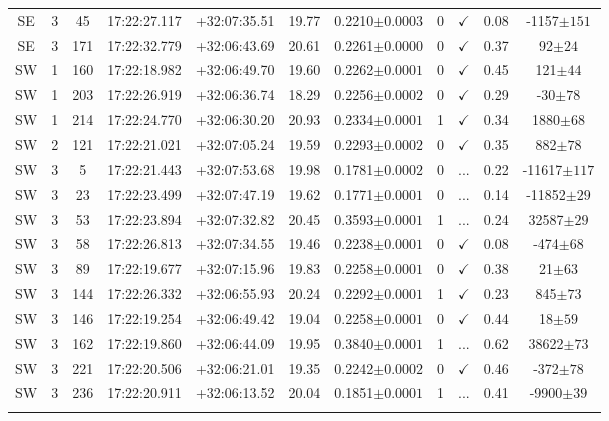 \begin{landscape}
\begin{longtable}{ccccccccccc}
	SE & 3 & 45 & 17:22:27.117 & +32:07:35.51 & 19.77 & 0.2210$\pm{0.0003}$ & 0 & $\checkmark$ & 0.08 & -1157$\pm{151}$ \\
	SE & 3 & 171 & 17:22:32.779 & +32:06:43.69 & 20.61 & 0.2261$\pm{0.0000}$ & 0 & $\checkmark$ & 0.37 & 92$\pm{24}$ \\
	SW & 1 & 160 & 17:22:18.982 & +32:06:49.70 & 19.60 & 0.2262$\pm{0.0001}$ & 0 & $\checkmark$ & 0.45 & 121$\pm{44}$ \\
	SW & 1 & 203 & 17:22:26.919 & +32:06:36.74 & 18.29 & 0.2256$\pm{0.0002}$ & 0 & $\checkmark$ & 0.29 & -30$\pm{78}$ \\
	SW & 1 & 214 & 17:22:24.770 & +32:06:30.20 & 20.93 & 0.2334$\pm{0.0001}$ & 1 & $\checkmark$ & 0.34 & 1880$\pm{68}$ \\
	SW & 2 & 121 & 17:22:21.021 & +32:07:05.24 & 19.59 & 0.2293$\pm{0.0002}$ & 0 & $\checkmark$ & 0.35 & 882$\pm{78}$ \\
	SW & 3 & 5 & 17:22:21.443 & +32:07:53.68 & 19.98 & 0.1781$\pm{0.0002}$ & 0 & ... & 0.22 & -11617$\pm{117}$ \\
	SW & 3 & 23 & 17:22:23.499 & +32:07:47.19 & 19.62 & 0.1771$\pm{0.0001}$ & 0 & ... & 0.14 & -11852$\pm{29}$ \\
	SW & 3 & 53 & 17:22:23.894 & +32:07:32.82 & 20.45 & 0.3593$\pm{0.0001}$ & 1 & ... & 0.24 & 32587$\pm{29}$ \\
	SW & 3 & 58 & 17:22:26.813 & +32:07:34.55 & 19.46 & 0.2238$\pm{0.0001}$ & 0 & $\checkmark$ & 0.08 & -474$\pm{68}$ \\
	SW & 3 & 89 & 17:22:19.677 & +32:07:15.96 & 19.83 & 0.2258$\pm{0.0001}$ & 0 & $\checkmark$ & 0.38 & 21$\pm{63}$ \\
	SW & 3 & 144 & 17:22:26.332 & +32:06:55.93 & 20.24 & 0.2292$\pm{0.0001}$ & 1 & $\checkmark$ & 0.23 & 845$\pm{73}$ \\
	SW & 3 & 146 & 17:22:19.254 & +32:06:49.42 & 19.04 & 0.2258$\pm{0.0001}$ & 0 & $\checkmark$ & 0.44 & 18$\pm{59}$ \\
	SW & 3 & 162 & 17:22:19.860 & +32:06:44.09 & 19.95 & 0.3840$\pm{0.0001}$ & 1 & ... & 0.62 & 38622$\pm{73}$ \\
	SW & 3 & 221 & 17:22:20.506 & +32:06:21.01 & 19.35 & 0.2242$\pm{0.0002}$ & 0 & $\checkmark$ & 0.46 & -372$\pm{78}$ \\
	SW & 3 & 236 & 17:22:20.911 & +32:06:13.52 & 20.04 & 0.1851$\pm{0.0001}$ & 1 & ... & 0.41 & -9900$\pm{39}$ \\
	\hline
	\label{2tbl:MSJ172227.2+320757.2}
	\end{longtable}
\end{landscape}


